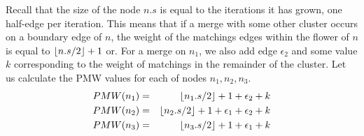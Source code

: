 Recall that the size of the node $n.s$ is equal to the iterations it has grown, one half-edge per iteration. This means that if a merge with some other cluster occurs on a boundary edge of $n$, the weight of the matchings edges within the flower of $n$ is equal to ${\left \lfloor n.s/2 \right \rfloor }+1$ or. For a merge on $n_1$, we also add edge $\epsilon_2$ and some value $k$ corresponding to the weight of matchings in the remainder of the cluster. Let us calculate the PMW values for each of nodes $n_1, n_2, n_3$.
\begin{eqnarray*}
  PMW(n_1) &=& {\left \lfloor n_1.s/2 \right \rfloor }+1 + \epsilon_2 + k \\
  PMW(n_2) &=& {\left \lfloor n_2.s/2 \right \rfloor }+1 + \epsilon_1 + \epsilon_2 + k \\
  PMW(n_3) &=& {\left \lfloor n_3.s/2 \right \rfloor }+1 + \epsilon_1 +k
\end{eqnarray*}

